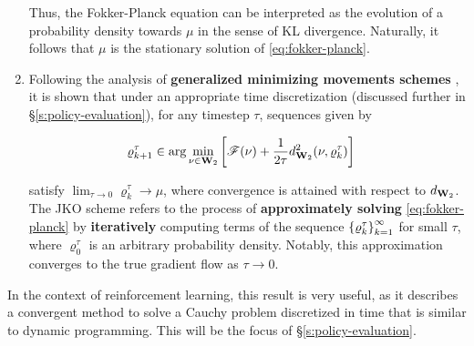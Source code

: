 \begin{enumerate}
    Thus, the Fokker-Planck equation can be interpreted as the evolution of
    a probability density towards $\mu$ in the sense of KL divergence.
    Naturally, it follows that $\mu$ is the stationary solution of
    \eqref{eq:fokker-planck}.
  \item Following the analysis of \textbf{generalized minimizing movements
      schemes}
    \citep{de1993new}, it is shown that under an appropriate time discretization
    (discussed further in \S\ref{s:policy-evaluation}), for any timestep $\tau$,
    sequences given by

    \begin{align*}
      \varrho^\tau_{k+1} &\in \arg\min_{\nu\in\mathbf{W}_{2}}\left[\mathscr{F}(\nu) +
      \frac{1}{2\tau}d_{\mathbf{W}_{2}}^2(\nu, \varrho^\tau_k)\right]
    \end{align*}

    satisfy $\lim_{\tau\to 0}\varrho^\tau_k\to \mu$, where convergence is
    attained with respect to $d_{\mathbf{W}_{2}}$. The JKO scheme refers to
    the process of \textbf{approximately solving} \eqref{eq:fokker-planck} by
    \textbf{iteratively}
    computing terms of the sequence $\left\{\varrho^\tau_{k}\right\}_{k=1}^{\infty}$ for
    small $\tau$, where $\varrho^\tau_0$ is an arbitrary probability density.
    Notably, this approximation converges to the true gradient flow as $\tau\to
    0$.
\end{enumerate}

In the context of reinforcement learning, this result is very useful, as it
describes a convergent method to solve a Cauchy problem discretized in time that
is similar to dynamic programming. This will be the focus of
\S\ref{s:policy-evaluation}.
